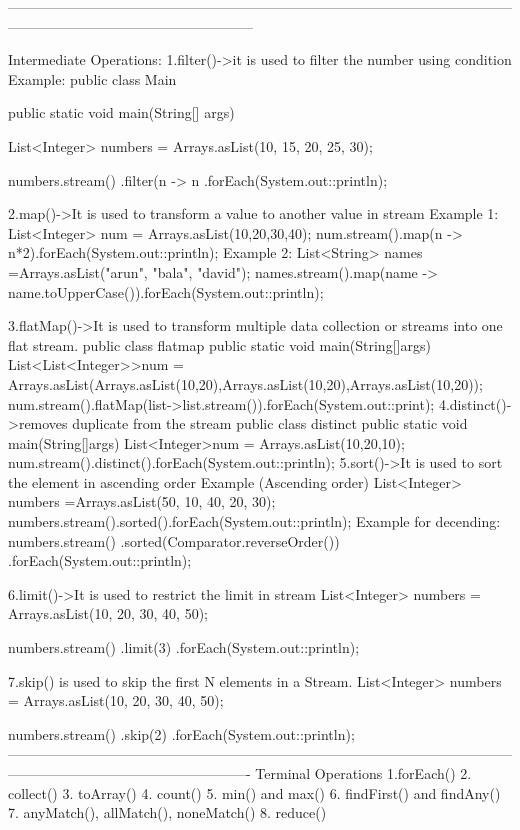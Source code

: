 {{{{{{{{-----------------------------------------------------------------------------------------------------------------------------------------------------------------


Intermediate Operations:
1.filter()->it is used to filter the number using condition
Example:
public class Main {
    public static void main(String[] args) {


        List<Integer> numbers =
            Arrays.asList(10, 15, 20, 25, 30);


        numbers.stream()
               .filter(n -> n %
               .forEach(System.out::println);
    }
}


2.map()->It is used to transform a value to another value in stream
Example 1:
List<Integer> num = Arrays.asList(10,20,30,40);
num.stream().map(n -> n*2).forEach(System.out::println);
Example 2:
List<String> names =Arrays.asList("arun", "bala", "david");
names.stream().map(name -> name.toUpperCase()).forEach(System.out::println);


3.flatMap()->It is used to transform multiple data collection or streams into one flat stream.
public class flatmap {
public static void main(String[]args) {
  List<List<Integer>>num = Arrays.asList(Arrays.asList(10,20),Arrays.asList(10,20),Arrays.asList(10,20));
  num.stream().flatMap(list->list.stream()).forEach(System.out::print);
}
}
4.distinct()->removes duplicate from the stream
public class distinct {
	public static void main(String[]args) {
		List<Integer>num = Arrays.asList(10,20,10);
		num.stream().distinct().forEach(System.out::println);
	}}
5.sort()->It is used to sort the element in ascending order
Example (Ascending order)
	List<Integer> numbers =Arrays.asList(50, 10, 40, 20, 30);
	numbers.stream().sorted().forEach(System.out::println);
Example for decending:
numbers.stream()
       .sorted(Comparator.reverseOrder())
       .forEach(System.out::println);
	   
6.limit()->It is used to restrict the limit in stream
List<Integer> numbers =
    Arrays.asList(10, 20, 30, 40, 50);


numbers.stream()
       .limit(3)
       .forEach(System.out::println);
	   
7.skip() is used to skip the first N elements in a Stream.
List<Integer> numbers =
    Arrays.asList(10, 20, 30, 40, 50);


numbers.stream()
       .skip(2)
       .forEach(System.out::println);
----------------------------------------------------------------------------------------------------------------------------------------------------------------
Terminal Operations
	1.forEach()
	2. collect()
	3. toArray()
	4. count()
	5. min() and max()
	6. findFirst() and findAny()
	7. anyMatch(), allMatch(), noneMatch()
	8. reduce()
	
}}}}}}}}
